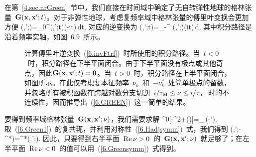 在第~\ref{4.sec.nrGreen}~节中，我们直接在时间域中确定了无自转弹性地球的格林张量~$\bG(\bx,\bx';t)$。对于非弹性地球，考虑复频率域中格林张量的傅里叶变换会更加方便
\eq
\bG(\bx,\bx';\nu)=\int_0^{\infty}\bG(\bx,\bx';t)\exp(-i\nu t)\,dt,
\en
对应的逆变换为
\eq
\label{6.invFtrf}
\bG(\bx,\bx';t)=\int_{-\infty}^{\infty}
\bG(\bx,\bx';\nu)\exp(i\nu t)\,d\nu,
\en
其中积分路径是沿着频率实轴，如图~6.9~所示。
\begin{figure}[!b]
\begin{center}
\end{center}
\caption[ Green contour]{
计算傅里叶逆变换~(\ref{6.invFtrf})~时所使用的积分路径。当~$t<0$~时，积分路径在下半平面闭合。由于下半平面没有极点或其他奇点，因此${\bf G}
({\bf x},{\bf x}';t)={\bf 0}$。当~$t>0$~时，积分路径在上半平面闭合，如图所示。在此仅考虑复本征频率~$\nu_k$~和~$-\nu_k^*$~处简单极点的留数，并忽略所有被积函数在跨越对数分支切割~$i/\tau_{\rm M}\leq\nu\leq i/\tau_{\rm m}$~时的不连续性，因而推导出~(\ref{6.GREEN})~这一简单的结果。
}
\end{figure}
要得到频率域格林张量~$\bG(\bx,\bx';\nu)$，我们需要求解
\eq
\label{6.Green1}
\rho^0[-\nu^2\bG+\sH(\nu)\bG]=\bI_{\,}\delta(\bx-\bx').
\en
取~(\ref{6.Green1})~的复共轭，并利用对称性~(\ref{6.Hadjsymm})~式，我们得到
\eq
\label{6.Greensymm}
\bG(\bx,\bx';-\nu^*)=\bG^*(\bx,\bx';\nu).
\en
因此，只要得到右半平面~$\Re{\rm e}_{\,}\nu > 0$~的~$\bG(\bx,\bx';\nu)$~就足够了；在左半平面~$\Re{\rm e}_{\,}\nu < 0$~的值可以用~(\ref{6.Greensymm})~式得到。

